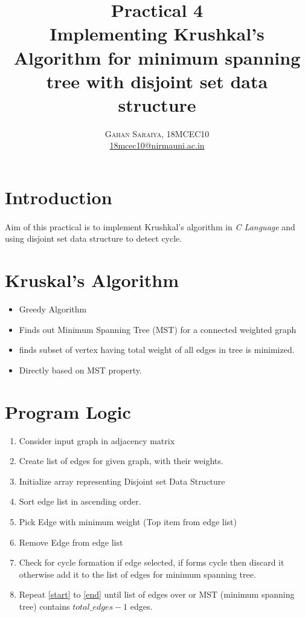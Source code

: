 \documentclass[paper=letter, fontsize=12pt]{article}
\title{\vspace{-15mm}\fontsize{24pt}{10pt}\selectfont\textbf{Practical 4 \\ Implementing Krushkal's Algorithm for minimum spanning tree with disjoint set data structure}} %
\author{
\large
{\textsc{Gahan Saraiya, 18MCEC10 }}\\[2mm]
\normalsize \href{mailto:18mcec10@nirmauni.ac.in}{18mcec10@nirmauni.ac.in}\\[2mm] %
}
\date{}
\begin{document}
\maketitle %
\thispagestyle{fancy} %

\newcommand*\tick{\item[\Checkmark]}
\newcommand*\arrow{\item[$\Rightarrow$]}
\newcommand*\fail{\item[\XSolidBrush]}

\section{Introduction}
\paragraph{}
Aim of this practical is to implement Krushkal's algorithm in \textit{C Language} and using disjoint set data structure to detect cycle.

\section{Kruskal's Algorithm}
\begin{itemize}
	\item Greedy Algorithm
	\item Finds out Minimum Spanning Tree (MST) for a connected weighted graph
	\item finds subset of vertex having total weight of all edges in tree is minimized.
	\item Directly based on MST property.
\end{itemize}

\section{Program Logic}
\begin{enumerate}
	\item Consider input graph in adjacency matrix 
	\item Create list of edges for given graph, with their weights.
	\item Initialize array representing Disjoint set Data Structure
	\item Sort edge list in ascending order.
	\item \label{start} Pick Edge with minimum weight (Top item from edge list)
	\item Remove Edge from edge list
	\item \label{end} Check for cycle formation if edge selected, if forms cycle then discard it otherwise add it to the list of edges for minimum spanning tree.
	\item Repeat \ref{start} to \ref{end} until list of edges over or MST (minimum spanning tree) contains $ total\_edges - 1$ edges.
	
\end{enumerate}
\end{document}
